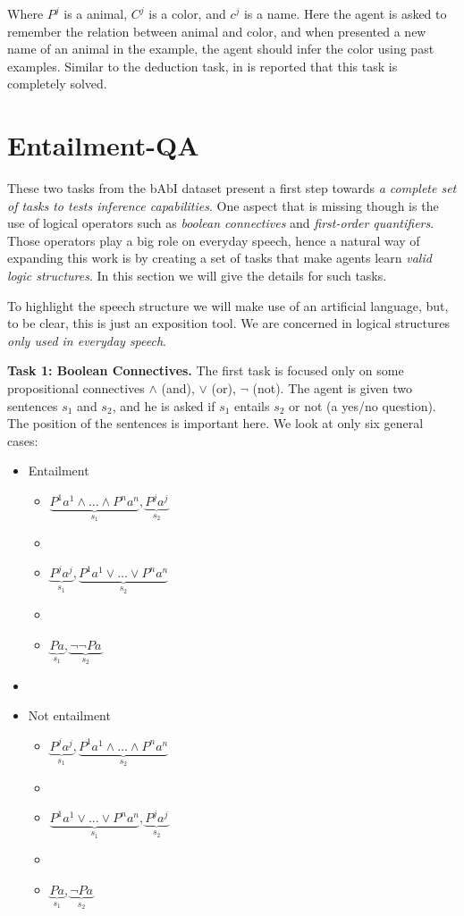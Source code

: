 Where $P^{j}$ is a animal, $C^{j}$ is a color, and $c^{j}$ is a name. Here the agent is asked to remember the relation between animal and color, and when presented a new name of an animal in the example, the agent should infer the color using past examples. Similar to the deduction task, in \cite{WestonBCM15} is reported that this task is completely solved.

\section{Entailment-QA}
\label{ch:03-EQA}

These two tasks from the bAbI dataset present a first step towards \textit{a complete set of tasks to tests inference capabilities}. One aspect that is missing though is the use of logical operators such as \textit{boolean connectives} and \textit{first-order quantifiers}. Those operators play a big role on everyday speech, hence a natural way of expanding this work is by creating a set of tasks that make agents learn \textit{valid logic structures}. In this section we will give the details for such tasks. 

To highlight the speech structure we will make use of an artificial language, but, to be clear, this is just an exposition tool. We are concerned in logical structures \textit{only used in everyday speech}.

\textbf{Task 1: Boolean Connectives.} The first task is focused only on some propositional connectives $\land$ (and), $\lor$ (or), $\lnot$ (not). The agent is given two sentences $s_1$ and $s_2$, and he is asked if $s_1$ entails $s_2$ or not (a yes/no question). The position of the sentences is important here. We look at only six general cases:

\begin{itemize}
\item Entailment
\begin{itemize}
\item $\underbrace{P^{1}a^1 \land \dots \land P^{n}a^n}_{s_1}, \underbrace{P^{j}a^j}_{s_2}$ 
\item[]
\item $\underbrace{P^{j}a^j}_{s_1}, \underbrace{P^{1}a^1 \lor \dots \lor P^{n}a^n}_{s_2}$
\item[]
\item $\underbrace{Pa}_{s_1}, \underbrace{\lnot \lnot Pa}_{s_2}$
\end{itemize}
\item[]

\item Not entailment
\begin{itemize}
\item $\underbrace{P^{j}a^j}_{s_1}, \underbrace{P^{1}a^1 \land \dots \land P^{n}a^n}_{s_2}$
\item[]
\item $\underbrace{P^{1}a^1 \lor \dots \lor P^{n}a^n}_{s_1}, \underbrace{P^{j}a^j}_{s_2}$
\item[]
\item $\underbrace{Pa}_{s_1}, \underbrace{\lnot Pa}_{s_2}$
\end{itemize}
\end{itemize}

